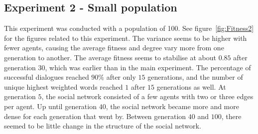\subsection{Experiment 2 - Small population}
This experiment was conducted with a population of 100. See figure~\ref{fig:Fitness2} for the figures related to this experiment. The variance seems to be higher with fewer agents, causing the average fitness and degree vary more from one generation to another. The average fitness seems to stabilise at about $0.85$ after generation $30$, which was earlier than in the main experiment. The percentage of successful dialogues reached $90\%$ after only $15$ generations, and the number of unique highest weighted words reached $1$ after $15$ generations as well. At generation $5$, the social network consisted of a few agents with two or three edges per agent. Up until generation $40$, the social network became more and more dense for each generation that went by. Between generation $40$ and $100$, there seemed to be little change in the structure of the social network.   

